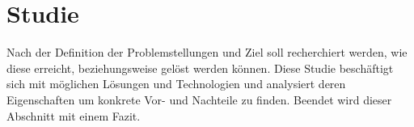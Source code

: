 \chapter{Studie}
Nach der Definition der Problemstellungen und Ziel soll recherchiert werden, wie diese erreicht, beziehungsweise gelöst werden können. Diese Studie beschäftigt sich mit möglichen Lösungen und Technologien und analysiert deren Eigenschaften um konkrete Vor- und Nachteile zu finden.
Beendet wird dieser Abschnitt mit einem Fazit.